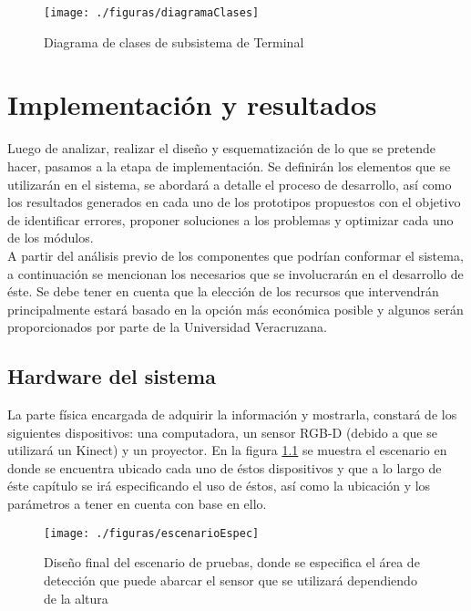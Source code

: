 \documentclass[a4paper,openright,12pt]{report}
\begin{document}
\begin{figure}[th]
	\centering
	\texttt{[image: ./figuras/diagramaClases]}
	\caption{Diagrama de clases de subsistema de Terminal} \label{fig:diagramaClases}
\end{figure}


\chapter{Implementación y resultados}\label{cap.implementacionyresultados}
Luego de analizar, realizar el diseño y esquematización de lo que se pretende hacer, pasamos a la etapa de implementación. Se definirán los elementos que se utilizarán en el sistema, se abordará a detalle el proceso de desarrollo, así como los resultados generados en cada uno de los prototipos propuestos con el objetivo de identificar errores, proponer soluciones a los problemas y optimizar cada uno de los módulos.\\
A partir del análisis previo de los componentes que podrían conformar el sistema, a continuación se mencionan los  necesarios que se involucrarán en el desarrollo de éste. Se debe tener en cuenta que la elección de los recursos que intervendrán principalmente estará basado en la opción más económica posible y algunos serán proporcionados por parte de la Universidad Veracruzana.
\vspace*{10 mm}
\section{Hardware del sistema}
La parte física encargada de adquirir la información y mostrarla, constará de los siguientes dispositivos: una computadora, un sensor RGB-D (debido a que se utilizará un Kinect\textcopyright) y un proyector. En la figura \ref{fig:escenarioEspec} se muestra el escenario en donde se encuentra ubicado cada uno de éstos dispositivos y que a lo largo de éste capítulo se irá especificando el uso de éstos, así como la ubicación y los parámetros a tener en cuenta con base en ello.\\
\begin{figure}[H]
	\centering
	\texttt{[image: ./figuras/escenarioEspec]}
	\caption[Diseño final del escenario de pruebas]{Diseño final del escenario de pruebas, donde se especifica el área de detección que puede abarcar el sensor que se utilizará dependiendo de la altura} \label{fig:escenarioEspec}
\end{figure}
\end{document}
